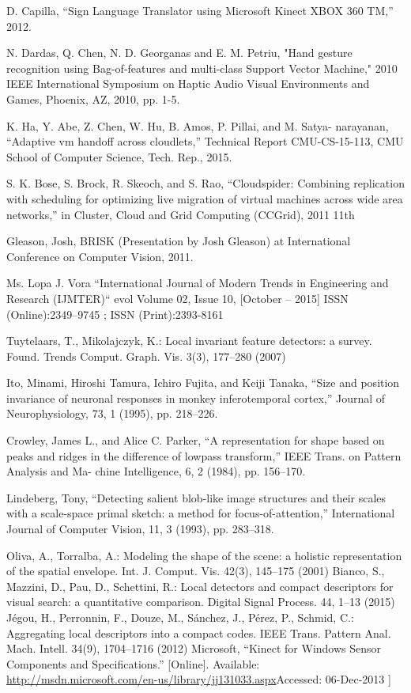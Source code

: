 \documentclass[12pt]{report}           %
\begin{document}
\begin{thebibliography}{80}
 D. Capilla, “Sign Language Translator using Microsoft Kinect XBOX 360 TM,” 2012. 


N. Dardas, Q. Chen, N. D. Georganas and E. M. Petriu, "Hand gesture recognition using Bag-of-features and multi-class Support Vector Machine," 2010 IEEE International Symposium on Haptic Audio Visual Environments and Games, Phoenix, AZ, 2010, pp. 1-5.






 K. Ha, Y. Abe, Z. Chen, W. Hu, B. Amos, P. Pillai, and M. Satya- narayanan, “Adaptive vm handoff across cloudlets,” Technical Report CMU-CS-15-113, CMU School of Computer Science, Tech. Rep., 2015.

 S. K. Bose, S. Brock, R. Skeoch, and S. Rao, “Cloudspider: Combining replication with scheduling for optimizing live migration of virtual machines across wide area networks,” in Cluster, Cloud and Grid Computing (CCGrid), 2011 11th

  Gleason, Josh, BRISK (Presentation by Josh Gleason) at International Conference on
Computer Vision, 2011.

  Ms. Lopa J. Vora “International Journal of Modern Trends in Engineering and Research (IJMTER)“ evol Volume 02, Issue 10, [October – 2015] ISSN (Online):2349–9745 ; ISSN (Print):2393-8161

 Tuytelaars, T., Mikolajczyk, K.: Local invariant feature detectors: a survey. Found. Trends
Comput. Graph. Vis. 3(3), 177–280 (2007)

  Ito, Minami, Hiroshi Tamura, Ichiro Fujita, and Keiji
Tanaka, “Size and position invariance of neuronal responses
in monkey inferotemporal cortex,”
Journal of Neurophysiology, 73, 1 (1995), pp. 218–226.


 Crowley, James L., and Alice C. Parker, “A representation
for shape based on peaks and ridges in the difference of lowpass
transform,”
IEEE Trans. on Pattern Analysis and Ma-
chine Intelligence,
6, 2 (1984), pp. 156–170.

Lindeberg, Tony, “Detecting salient blob-like image structures and their scales with a scale-space primal sketch:
a method for focus-of-attention,”
International Journal of
Computer Vision,
11, 3 (1993), pp. 283–318.



 Oliva, A., Torralba, A.: Modeling the shape of the scene: a holistic representation of the spatial
envelope. Int. J. Comput. Vis. 42(3), 145–175 (2001)
 Bianco, S., Mazzini, D., Pau, D., Schettini, R.: Local detectors and compact descriptors for
visual search: a quantitative comparison. Digital Signal Process. 44, 1–13 (2015)
 Jégou, H., Perronnin, F., Douze, M., Sánchez, J., Pérez, P., Schmid, C.: Aggregating local
descriptors into a compact codes. IEEE Trans. Pattern Anal. Mach. Intell. 34(9), 1704–1716
(2012)
Microsoft, “Kinect for Windows Sensor Components and Specifications.” [Online]. Available: \url{http://msdn.microsoft.com/en-us/library/jj131033.aspx}Accessed: 06-Dec-2013 ]


\end{thebibliography}
\end{document}
